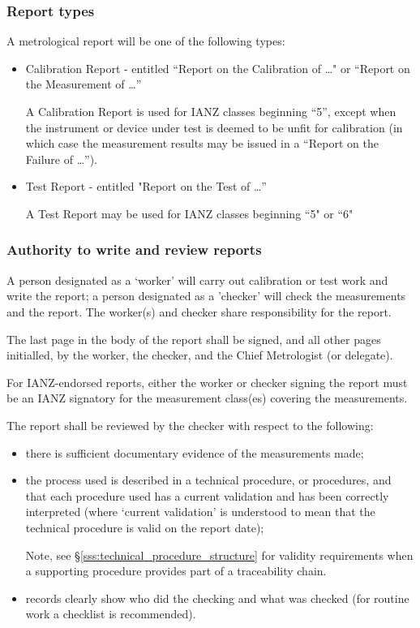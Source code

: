 \subsubsection{Report types}
A metrological report will be one of the following types:
\begin{itemize}
\item Calibration Report - entitled ``Report on the Calibration of \ldots" or ``Report on the Measurement of \ldots'' 

A Calibration Report is used for IANZ classes beginning ``5'', except when the instrument or device under test is deemed to be unfit for calibration (in which case the measurement results may be issued in a ``Report on the Failure of \ldots'').

\item Test Report - entitled "Report on the Test of \ldots''  

A Test Report may be used for IANZ classes beginning ``5" or ``6"
\end{itemize} 

\subsubsection{Authority to write and review reports}
A person designated as a ‘worker’ will carry out calibration or test work and write the report; a person designated as a 'checker’ will check the measurements and the report. The worker(s) and checker share responsibility for the report.

The last page in the body of the report shall be signed, and all other pages initialled, by the worker, the checker, and the Chief Metrologist (or delegate). 

For IANZ-endorsed reports, either the worker or checker signing the report must be an IANZ signatory for the measurement class(es) covering the measurements.

The report shall be reviewed by the checker with respect to the following: 
\begin{itemize}
\item there is sufficient documentary evidence of the measurements made;
\item the process used is described in a technical procedure, or procedures, and that each procedure used has a current validation and has been correctly interpreted (where ‘current validation' is understood to mean that the technical procedure is valid on the report date);

Note, see \S\ref{sss:technical_procedure_structure} for validity requirements when a supporting procedure provides part of a traceability chain.

\item records clearly show who did the checking and what was checked (for routine work a checklist is recommended).
\end{itemize} 

